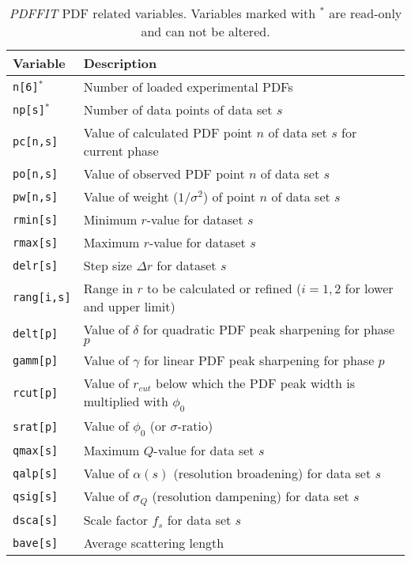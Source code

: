 \begin{table}[!htb]
\centering
\begin{tabularx}{\textwidth}{|p{30mm}|X|}
  \hline
  {\bf Variable} & {\bf Description} \\
  \hline \hline
  {\tt n[6]}$^{*}$    & Number of loaded experimental PDFs \\
  {\tt np[s]}$^{*}$   & Number of data points of data set $s$ \\
  \hline
  {\tt pc[n,s]}       & Value of calculated PDF point $n$ of data set
                        $s$ for current phase \\
  {\tt po[n,s]}       & Value of observed PDF point $n$ of data set $s$ \\
  {\tt pw[n,s]}       & Value of weight ($1/\sigma^{2}$) of point $n$
                        of data set $s$ \\
  \hline
  {\tt rmin[s]}       & Minimum $r$-value for dataset $s$ \\
  {\tt rmax[s]}       & Maximum $r$-value for dataset $s$ \\
  {\tt delr[s]}       & Step size $\Delta r$ for dataset $s$ \\
  {\tt rang[i,s]}     & Range in $r$ to be calculated or refined ($i=1,2$
                        for lower and upper limit) \\
  \hline
  {\tt delt[p]}       & Value of $\delta$ for quadratic PDF peak sharpening for
                        phase $p$\\
  {\tt gamm[p]}       & Value of $\gamma$ for linear PDF peak sharpening for
                        phase $p$\\
  {\tt rcut[p]}       & Value of $r_{cut}$ below which the PDF peak width
                        is multiplied with $\phi_{0}$ \\
  {\tt srat[p]}       & Value of $\phi_{0}$ (or $\sigma$-ratio) \\
  {\tt qmax[s]}       & Maximum $Q$-value for data set $s$ \\
  {\tt qalp[s]}       & Value of $\alpha(s)$ (resolution broadening) for
                        data set $s$ \\
  {\tt qsig[s]}       & Value of $\sigma_{Q}$ (resolution dampening) for
                        data set $s$ \\
  {\tt dsca[s]}       & Scale factor $f_{s}$ for data set $s$ \\
  {\tt bave[s]}       & Average scattering length \\
  \hline
\end{tabularx}
\caption[{\it PDFFIT} PDF related variables]
        {\label{v2-tab}{\it PDFFIT} PDF related variables. Variables marked
         with $^{*}$ are read-only and can not be altered.}
\end{table}

